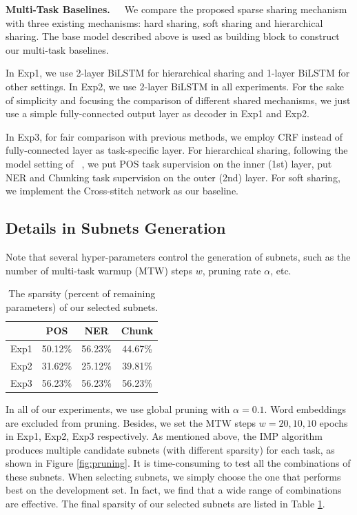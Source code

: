 \documentclass[letterpaper]{article} %
\newcommand{\citet}[1]{\citeauthor{#1}~\shortcite{#1}}
\begin{document}
\textbf{Multi-Task Baselines.}\ \ \ We compare the proposed sparse sharing mechanism with three existing mechanisms: hard sharing, soft sharing and hierarchical sharing. The base model described above is used as building block to construct our multi-task baselines.

In Exp1, we use 2-layer BiLSTM for hierarchical sharing and 1-layer BiLSTM for other settings. In Exp2, we use 2-layer BiLSTM in all experiments.
For the sake of simplicity and focusing the comparison of different shared mechanisms, we just use a simple fully-connected output layer as decoder in Exp1 and Exp2.

In Exp3, for fair comparison with previous methods, we employ CRF \cite{DBLP:conf/icml/LaffertyMP01} instead of fully-connected layer as task-specific layer. For hierarchical sharing, following the model setting of \citet{DBLP:conf/acl/SogaardG16}, we put POS task supervision on the inner (1st) layer, put NER and Chunking task supervision on the outer (2nd) layer. For soft sharing, we implement the Cross-stitch network \cite{DBLP:conf/cvpr/MisraSGH16} as our baseline.

\subsection{Details in Subnets Generation}
Note that several hyper-parameters control the generation of subnets, such as the number of multi-task warmup (MTW) steps $w$, pruning rate $\alpha$, etc.

\begin{table}[htbp]
\centering
\begin{tabular}{lccc}
\toprule
& POS     & NER     & Chunk   \\ \midrule
Exp1 & 50.12\% & 56.23\% & 44.67\% \\
Exp2 & 31.62\% & 25.12\% & 39.81\% \\
Exp3 & 56.23\% & 56.23\% & 56.23\% \\
\bottomrule
\end{tabular}
\caption{The sparsity (percent of remaining parameters) of our selected subnets.}
\label{tb:sparsity}
\end{table}

In all of our experiments, we use global pruning with $\alpha=0.1$. Word embeddings are excluded from pruning. Besides, we set the MTW steps $w=20, 10, 10$ epochs in Exp1, Exp2, Exp3 respectively. As mentioned above, the IMP algorithm produces multiple candidate subnets (with different sparsity) for each task, as shown in Figure \ref{fig:pruning}. It is time-consuming to test all the combinations of these subnets. When selecting subnets, we simply choose the one that performs best on the development set. In fact, we find that a wide range of combinations are effective. The final sparsity of our selected subnets are listed in Table \ref{tb:sparsity}.
\end{document}
